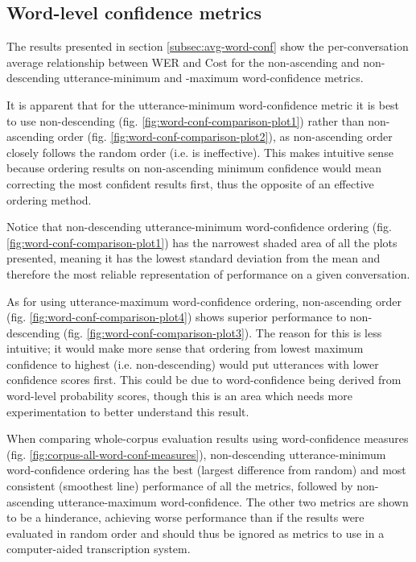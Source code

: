 \subsection{Word-level confidence metrics}

The results presented in section \ref{subsec:avg-word-conf} show the per-conversation average relationship between WER and Cost for the non-ascending and non-descending utterance-minimum and -maximum word-confidence metrics.

It is apparent that for the utterance-minimum word-confidence metric it is best to use non-descending (fig. \ref{fig:word-conf-comparison-plot1}) rather than non-ascending order (fig. \ref{fig:word-conf-comparison-plot2}), as non-ascending order closely follows the random order (i.e. is ineffective).
This makes intuitive sense because ordering results on non-ascending minimum confidence would mean correcting the most confident results first, thus the opposite of an effective ordering method.

Notice that non-descending utterance-minimum word-confidence ordering (fig. \ref{fig:word-conf-comparison-plot1}) has the narrowest shaded area of all the plots presented, meaning it has the lowest standard deviation from the mean and therefore the most reliable representation of performance on a given conversation.

As for using utterance-maximum word-confidence ordering, non-ascending order (fig. \ref{fig:word-conf-comparison-plot4}) shows superior performance to non-descending (fig. \ref{fig:word-conf-comparison-plot3}).
The reason for this is less intuitive; it would make more sense that ordering from lowest maximum confidence to highest (i.e. non-descending) would put utterances with lower confidence scores first.
This could be due to word-confidence being derived from word-level probability scores, though this is an area which needs more experimentation to better understand this result.

When comparing whole-corpus evaluation results using word-confidence measures (fig. \ref{fig:corpus-all-word-conf-measures}), non-descending utterance-minimum word-confidence ordering has the best (largest difference from random) and most consistent (smoothest line) performance of all the metrics, followed by non-ascending utterance-maximum word-confidence.
The other two metrics are shown to be a hinderance, achieving worse performance than if the results were evaluated in random order and should thus be ignored as metrics to use in a computer-aided transcription system.

